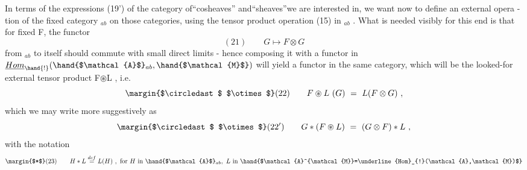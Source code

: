 In terms of the expressions (19') of the category of``cosheaves''
and``sheaves''we are interested in, we want now to define an external opera
-tion of the  fixed category $_{ab}$ on those categories, using the
tensor product operation (15) in $_{ab}$ . What is needed visibly for
this end is that  for fixed F, the functor
\[ (21) \qquad G \longmapsto F\otimes G \]
from $_{ab}$ to itself should commute with small direct limits - hence
composing it with a functor  in $\underline{Hom}_{\hand{!}}(\hand{$\mathcal{A}$}_{ab},\hand{$\mathcal{M}$})$ will yield a functor in
the same category, which will be the looked-for external tensor product
\margin{$\circledast$} F$\circledast$L , i.e.
\[ \margin{$\circledast$ $\otimes$} (22) \qquad F\circledast L\ (G) \ = \ L(F\otimes G) \ , \]
which we may write more suggestively as
\[ \margin{$\circledast$ $\otimes$} (22') \qquad G * (F\circledast L) \ = \ (G\otimes F) * L \ , \]
with the notation
\[ \margin{$*$} (23) \qquad H * L \overset{def}{=} L(H) \ , \text{ for } H \text{ in } \hand{$\mathcal{A}$}_{ab}, \ L \text{ in } \hand{$\mathcal{A}^{\mathcal{M}}=\underline{Hom}_{!}(\mathcal{A},\mathcal{M})$} \]


